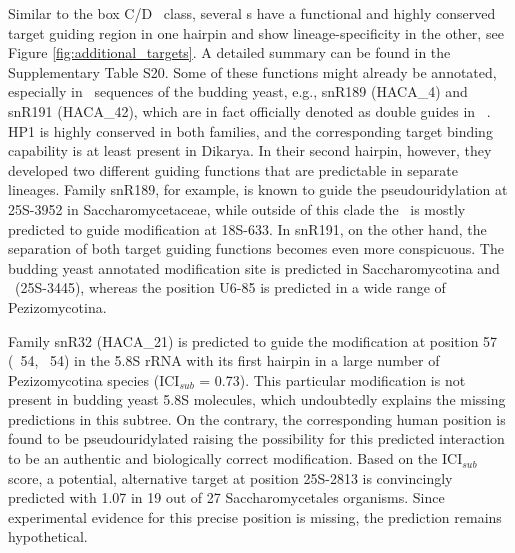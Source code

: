 Similar to the box C/D \sno\ class, several \haca s have a functional
and highly conserved target guiding region in one hairpin and show
lineage-specificity in the other, see Figure
\ref{fig:additional_targets}.  A detailed summary can be found in the
Supplementary Table S20. Some of these functions might already be
annotated, especially in \sno\ sequences of the budding yeast, e.g.,
snR189 (HACA\_4) and snR191 (HACA\_42), which are in fact
officially denoted as double guides in \sce\ \cite{Badis:2003,
  Schattner:2004}.  HP1 is highly conserved in both families, and the
corresponding target binding capability is at least present in
Dikarya. In their second hairpin, however, they developed two
different guiding functions that are predictable in separate
lineages. Family snR189, for example, is known to guide the
pseudouridylation at 25S-3952 in Saccharomycetaceae, while outside of
this clade the \sno\ is mostly predicted to guide modification at
18S-633. In snR191, on the other hand, the separation of both target
guiding functions becomes even more conspicuous. The budding yeast
annotated modification site is predicted in Saccharomycotina and \Tde\
(25S-3445), whereas the position U6-85 is predicted in a wide range of
Pezizomycotina.

Family snR32 (HACA\_21) is predicted to guide the modification at
position 57 (\ncr\ 54, \sce\ 54) in the 5.8S rRNA with its first
hairpin in a large number of Pezizomycotina species (ICI$_{sub}$ =
0.73). This particular modification is not present in budding yeast
5.8S molecules, which undoubtedly explains the missing predictions in
this subtree. On the contrary, the corresponding human position is
found to be pseudouridylated raising the possibility for this
predicted interaction to be an authentic and biologically correct
modification.  Based on the ICI$_{sub}$ score, a potential,
alternative target at position 25S-2813 is convincingly predicted with
1.07 in 19 out of 27 Saccharomycetales organisms. Since experimental
evidence for this precise position is missing, the prediction remains
hypothetical.


